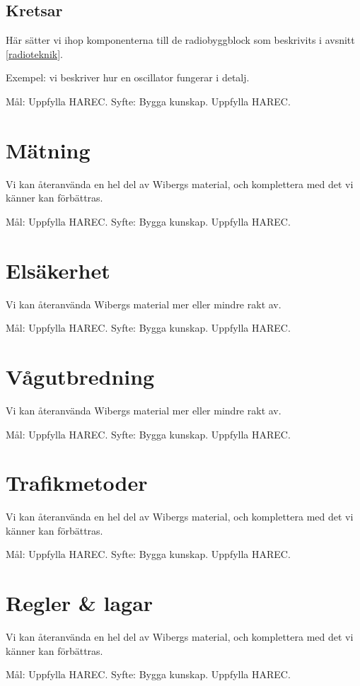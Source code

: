 \documentclass[a4paper,twoside,openright]{book}
\begin{document}
\section{Kretsar}
Här sätter vi ihop komponenterna till de radiobyggblock som beskrivits
i avsnitt \ref{radioteknik}.

Exempel: vi beskriver hur en oscillator fungerar i detalj.

Mål: Uppfylla HAREC.
Syfte: Bygga kunskap. Uppfylla HAREC.

\chapter{Mätning}
Vi kan återanvända en hel del av Wibergs material, och komplettera med
det vi känner kan förbättras.

Mål: Uppfylla HAREC.
Syfte: Bygga kunskap. Uppfylla HAREC.

\chapter{Elsäkerhet}
Vi kan återanvända Wibergs material mer eller mindre rakt av.

Mål: Uppfylla HAREC.
Syfte: Bygga kunskap. Uppfylla HAREC.

\chapter{Vågutbredning}
Vi kan återanvända Wibergs material mer eller mindre rakt av.

Mål: Uppfylla HAREC.
Syfte: Bygga kunskap. Uppfylla HAREC.

\chapter{Trafikmetoder}
Vi kan återanvända en hel del av Wibergs material, och komplettera med
det vi känner kan förbättras.

Mål: Uppfylla HAREC.
Syfte: Bygga kunskap. Uppfylla HAREC.

\chapter{Regler \& lagar}
Vi kan återanvända en hel del av Wibergs material, och komplettera med
det vi känner kan förbättras.

Mål: Uppfylla HAREC.
Syfte: Bygga kunskap. Uppfylla HAREC.
\end{document}
